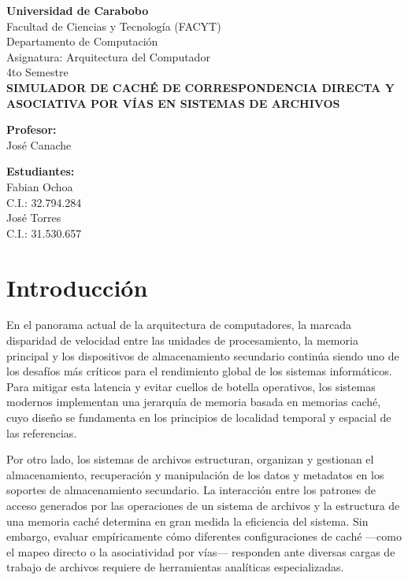 \documentclass[12pt,a4paper]{article}
\begin{document}
\begin{titlepage}
\centering
{\large \textbf{Universidad de Carabobo}} \\[0.2cm]
{\large Facultad de Ciencias y Tecnología (FACYT)} \\[0.2cm]
{\large Departamento de Computación} \\[0.2cm]
{\large Asignatura: Arquitectura del Computador} \\[0.2cm]
{\large 4to Semestre} \\[2.5cm]

{\Large \bfseries \color{black} SIMULADOR DE CACHÉ DE CORRESPONDENCIA DIRECTA Y ASOCIATIVA POR VÍAS EN SISTEMAS DE ARCHIVOS} \\[3.5cm]

\vfill

\noindent
\begin{minipage}[t]{0.45\textwidth}
\textbf{Profesor:} \\[0.2cm]
José Canache
\end{minipage}%
\hfill
\begin{minipage}[t]{0.45\textwidth}
\raggedleft
\textbf{Estudiantes:} \\[0.2cm]
Fabian Ochoa \\ C.I.: 32.794.284 \\[0.2cm]
José Torres \\ C.I.: 31.530.657
\end{minipage}

\vspace{1.5cm}
\end{titlepage}

\newpage


\section*{Introducción}
En el panorama actual de la arquitectura de computadores, la marcada disparidad de velocidad entre las unidades de procesamiento, la memoria principal y los dispositivos de almacenamiento secundario continúa siendo uno de los desafíos más críticos para el rendimiento global de los sistemas informáticos. Para mitigar esta latencia y evitar cuellos de botella operativos, los sistemas modernos implementan una jerarquía de memoria basada en memorias caché, cuyo diseño se fundamenta en los principios de localidad temporal y espacial de las referencias.

Por otro lado, los sistemas de archivos estructuran, organizan y gestionan el almacenamiento, recuperación y manipulación de los datos y metadatos en los soportes de almacenamiento secundario. La interacción entre los patrones de acceso generados por las operaciones de un sistema de archivos y la estructura de una memoria caché determina en gran medida la eficiencia del sistema. Sin embargo, evaluar empíricamente cómo diferentes configuraciones de caché —como el mapeo directo o la asociatividad por vías— responden ante diversas cargas de trabajo de archivos requiere de herramientas analíticas especializadas.
\end{document}
